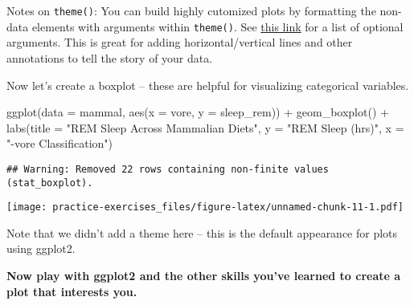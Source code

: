 \documentclass[]{article}
\newenvironment{Shaded}{\begin{snugshade}}{\end{snugshade}}
\newcommand{\AttributeTok}[1]{\textcolor[rgb]{0.77,0.63,0.00}{#1}}
\newcommand{\FunctionTok}[1]{\textcolor[rgb]{0.00,0.00,0.00}{#1}}
\newcommand{\NormalTok}[1]{#1}
\newcommand{\SpecialCharTok}[1]{\textcolor[rgb]{0.00,0.00,0.00}{#1}}
\newcommand{\StringTok}[1]{\textcolor[rgb]{0.31,0.60,0.02}{#1}}
\begin{document}
Notes on \texttt{theme()}: You can build highly cutomized plots by
formatting the non-data elements with arguments within \texttt{theme()}.
See \href{https://ggplot2.tidyverse.org/reference/theme.html}{this link}
for a list of optional arguments. This is great for adding
horizontal/vertical lines and other annotations to tell the story of
your data.

Now let's create a boxplot -- these are helpful for visualizing
categorical variables.

\begin{Shaded}
\begin{Highlighting}[]
\FunctionTok{ggplot}\NormalTok{(}\AttributeTok{data =}\NormalTok{ mammal, }\FunctionTok{aes}\NormalTok{(}\AttributeTok{x =}\NormalTok{ vore, }\AttributeTok{y =}\NormalTok{ sleep\_rem)) }\SpecialCharTok{+}
  \FunctionTok{geom\_boxplot}\NormalTok{() }\SpecialCharTok{+}
  \FunctionTok{labs}\NormalTok{(}\AttributeTok{title =} \StringTok{"REM Sleep Across Mammalian Diets"}\NormalTok{, }
       \AttributeTok{y =} \StringTok{"REM Sleep (hrs)"}\NormalTok{,}
       \AttributeTok{x =} \StringTok{"{-}vore Classification"}\NormalTok{)}
\end{Highlighting}
\end{Shaded}

\begin{verbatim}
## Warning: Removed 22 rows containing non-finite values (stat_boxplot).
\end{verbatim}

\texttt{[image: practice-exercises\_files/figure-latex/unnamed-chunk-11-1.pdf]}

Note that we didn't add a theme here -- this is the default appearance
for plots using ggplot2.

\textbf{Now play with ggplot2 and the other skills you've learned to
create a plot that interests you.}
\end{document}

